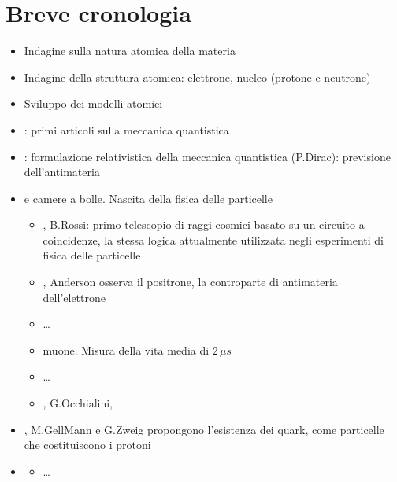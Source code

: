 \documentclass[letterpaper,10pt,italian]{jupyterBook}
\begin{document}
\section{Breve cronologia}
\label{\detokenize{ch/modern/standard:breve-cronologia}}\begin{itemize}
\item {} 
\sphinxAtStartPar
Indagine sulla natura atomica della materia

\item {} 
\sphinxAtStartPar
Indagine della struttura atomica: elettrone, nucleo (protone e neutrone)

\item {} 
\sphinxAtStartPar
Sviluppo dei modelli atomici

\item {} 
: primi articoli sulla meccanica quantistica

\item {} 
: formulazione relativistica della meccanica quantistica (P.Dirac): previsione dell’antimateria

\item {} 
\sphinxAtStartPar
{} e camere a bolle. Nascita della fisica delle particelle
\begin{itemize}
\item {} 
, B.Rossi: primo telescopio di raggi cosmici basato su un circuito a coincidenze, la stessa logica attualmente utilizzata negli esperimenti di fisica delle particelle

\item {} 
, Anderson osserva il positrone, la controparte di antimateria dell’elettrone

\item {} 
\sphinxAtStartPar
…

\item {} 
\sphinxAtStartPar
muone. Misura della vita media di \(2 \, \mu s\)

\item {} 
\sphinxAtStartPar
…

\item {} 
, G.Occhialini,

\end{itemize}

\item {} 
, M.Gell\sphinxhyphen{}Mann e G.Zweig propongono l’esistenza dei quark, come particelle che costituiscono i protoni

\item {} 
\sphinxAtStartPar
{}
\begin{itemize}
\item {} 
\sphinxAtStartPar
…

\end{itemize}

\end{itemize}
\end{document}
